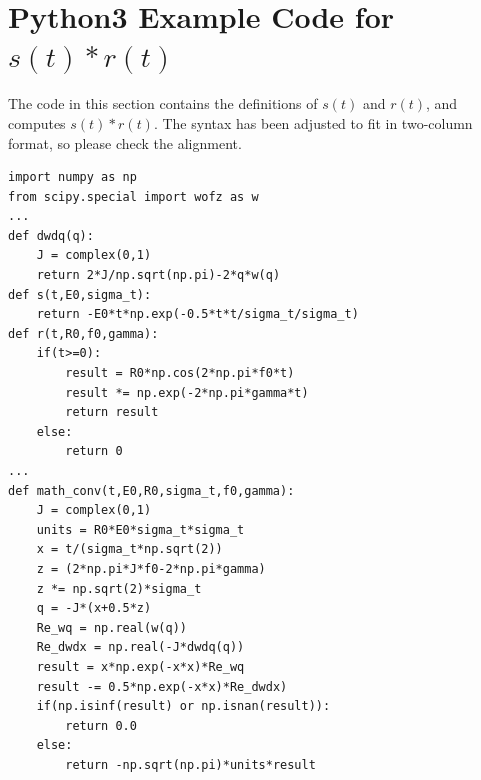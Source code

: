 \documentclass[amsmath,amssymb,aps,prd,10pt,twocolumn,showkeys]{revtex4}
\begin{document}
\section{Python3 Example Code for $s(t) * r(t)$}
\label{sec:appC}

The code in this section contains the definitions of $s(t)$ and $r(t)$, and computes $s(t) * r(t)$.  The syntax has been adjusted to fit in two-column format, so please check the alignment.

\small
\begin{verbatim}
import numpy as np
from scipy.special import wofz as w
...
def dwdq(q):
    J = complex(0,1)
    return 2*J/np.sqrt(np.pi)-2*q*w(q)
def s(t,E0,sigma_t):
    return -E0*t*np.exp(-0.5*t*t/sigma_t/sigma_t)
def r(t,R0,f0,gamma):
    if(t>=0):
        result = R0*np.cos(2*np.pi*f0*t)
        result *= np.exp(-2*np.pi*gamma*t)
        return result
    else:
        return 0
...
def math_conv(t,E0,R0,sigma_t,f0,gamma):
    J = complex(0,1)
    units = R0*E0*sigma_t*sigma_t
    x = t/(sigma_t*np.sqrt(2))
    z = (2*np.pi*J*f0-2*np.pi*gamma)
    z *= np.sqrt(2)*sigma_t
    q = -J*(x+0.5*z)
    Re_wq = np.real(w(q))
    Re_dwdx = np.real(-J*dwdq(q))
    result = x*np.exp(-x*x)*Re_wq
    result -= 0.5*np.exp(-x*x)*Re_dwdx)
    if(np.isinf(result) or np.isnan(result)):
        return 0.0
    else:
        return -np.sqrt(np.pi)*units*result
\end{verbatim}


\end{document}
